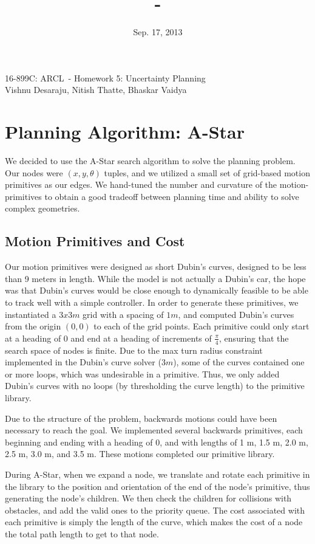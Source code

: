 \documentclass{article}
\title{\hwkTitle\ -\ \hwkClass}
\author{\hwkAuthor}
\date{Sep. 17, 2013}
\newcommand{\hwkTitle}{Homework 5: Uncertainty Planning}
\newcommand{\hwkAuthor}{Vishnu Desaraju, Nitish Thatte, Bhaskar Vaidya}
\newcommand{\hwkClass}{16-899C: ARCL}
\newcommand{\insertTitle}{\begin{center}\LARGE{\hwkClass\ - \hwkTitle} \\ \large{\hwkAuthor} \end{center}}
\begin{document}
\insertTitle
\vspace*{3ex}

\section{Planning Algorithm: A-Star}

We decided to use the A-Star search algorithm to solve the planning problem. Our nodes were $(x, y, \theta)$ tuples, and we utilized a small set of grid-based motion primitives as our edges. We hand-tuned the number and curvature of the motion-primitives to obtain a good tradeoff between planning time and ability to solve complex geometries.

\subsection{Motion Primitives and Cost}

Our motion primitives were designed as short Dubin's curves, designed to be less than 9 meters in length. While the model is not actually a Dubin's car, the hope was that Dubin's curves would be close enough to dynamically feasible to be able to track well with a simple controller. In order to generate these primitives, we instantiated a $3x3 m$ grid with a spacing of $1 m$, and computed Dubin's curves from the origin $(0,0)$ to each of the grid points. Each primitive could only start at a heading of $0$ and end at a heading of increments of $\frac{\pi}{4}$, ensuring that the search space of nodes is finite. Due to the max turn radius constraint implemented in the Dubin's curve solver ($3 m$), some of the curves contained one or more loops, which was undesirable in a primitive. Thus, we only added Dubin's curves with no loops (by thresholding the curve length) to the primitive library.

Due to the structure of the problem, backwards motions could have been necessary to reach the goal. We implemented several backwards primitives, each beginning and ending with a heading of $0$, and with lengths of 1 m, 1.5 m, 2.0 m, 2.5 m, 3.0 m, and 3.5 m. These motions completed our primitive library.


During A-Star, when we expand a node, we translate and rotate each primitive in the library to the position and orientation of the end of the node's primitive, thus generating the node's children. We then check the children for collisions with obstacles, and add the valid ones to the priority queue. The cost associated with each primitive is simply the length of the curve, which makes the cost of a node the total path length to get to that node.
\end{document}
